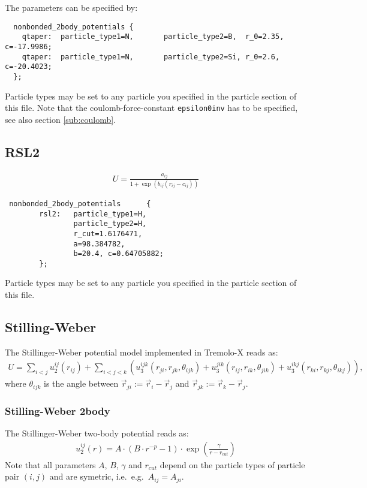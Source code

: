 The parameters can be specified by:
\begin{lstlisting}
  nonbonded_2body_potentials {
    qtaper:  particle_type1=N,       particle_type2=B,  r_0=2.35, c=-17.9986;
    qtaper:  particle_type1=N,       particle_type2=Si, r_0=2.6,  c=-20.4023;
  };
\end{lstlisting}
Particle types may be set to any particle you specified in the particle section of this file. Note that the coulomb-force-constant \verb+epsilon0inv+ has to be specified, see also section \ref{sub:coulomb}.

\subsection{RSL2}
\begin{align*}
U = \frac{a_{ij}}{1+\exp\left(b_{ij}(r_{ij}-c_{ij})\right)}
\end{align*}

\begin{lstlisting}
 nonbonded_2body_potentials      {
        rsl2:   particle_type1=H,
                particle_type2=H,
                r_cut=1.6176471,
                a=98.384782,
                b=20.4, c=0.64705882;
        };
\end{lstlisting}
Particle types may be set to any particle you specified in the particle section of this file.

\subsection{Stilling-Weber}
The Stillinger-Weber potential model \cite{stillinger} implemented in Tremolo-X reads as:
\begin{align*}
  U = \sum_{i<j} u^{ij}_{2}(r_{ij}) + \sum_{i<j<k} \left(u^{ijk}_{3}(r_{ji}, r_{jk}, \theta_{ijk}) + u^{jik}_{3}(r_{ij}, r_{ik}, \theta_{jik}) + u^{ikj}_{3}(r_{ki}, r_{kj}, \theta_{ikj})\right),
\end{align*}
where $\theta_{ijk}$ is the angle between $\vec{r}_{ji}:=\vec{r}_i-\vec{r}_j$ and $\vec{r}_{jk}:=\vec{r}_k-\vec{r}_j$. 

\subsubsection{Stilling-Weber 2body}
The Stillinger-Weber two-body potential reads as:
\begin{align*}
u^{ij}_{2}(r) = A\cdot(B\cdot r^{-p}-1)\cdot \exp\left({\frac{\gamma}{r-r_{cut}}}\right)
\end{align*}
Note that all parameters $A$, $B$, $\gamma$ and $r_{cut}$ depend on the particle types of particle pair $(i,j)$ and are symetric, i.e.\ e.g.\ $A_{ij} = A_{ji}$.

